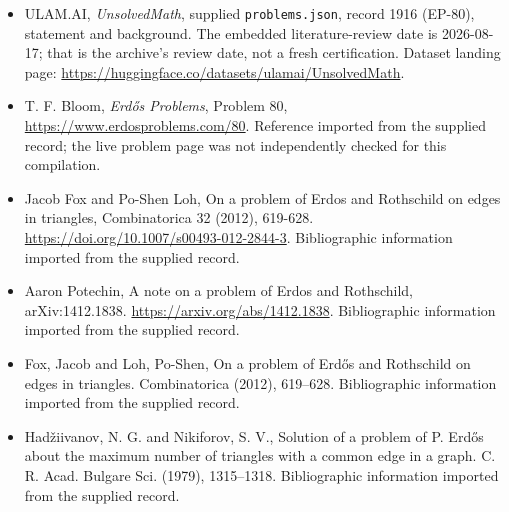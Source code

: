 \documentclass[11pt,a4paper]{article}
\begin{document}
{\small

\begin{itemize}

\item[\hypertarget{source:1916:1}{S1}] ULAM.AI, \emph{UnsolvedMath}, supplied \texttt{problems.json}, record 1916 (EP-80), statement and background. The embedded literature-review date is 2026-08-17; that is the archive’s review date, not a fresh certification. Dataset landing page: \url{https://huggingface.co/datasets/ulamai/UnsolvedMath}.

\item[\hypertarget{source:1916:2}{S2}] T. F. Bloom, \emph{Erdős Problems}, Problem 80, \url{https://www.erdosproblems.com/80}. Reference imported from the supplied record; the live problem page was not independently checked for this compilation.

\item[\hypertarget{source:1916:3}{S3}] Jacob Fox and Po-Shen Loh, On a problem of Erdos and Rothschild on edges in triangles, Combinatorica 32 (2012), 619-628. \url{https://doi.org/10.1007/s00493-012-2844-3}. Bibliographic information imported from the supplied record.

\item[\hypertarget{source:1916:4}{S4}] Aaron Potechin, A note on a problem of Erdos and Rothschild, arXiv:1412.1838. \url{https://arxiv.org/abs/1412.1838}. Bibliographic information imported from the supplied record.

\item[\hypertarget{source:1916:5}{S5}] Fox, Jacob and Loh, Po-Shen, On a problem of Erd\H{o}s and {R}othschild on edges in triangles. Combinatorica (2012), 619--628. Bibliographic information imported from the supplied record.

\item[\hypertarget{source:1916:6}{S6}] Had\v ziivanov, N. G. and Nikiforov, S. V., Solution of a problem of {P}. Erd\H{o}s about the maximum number of triangles with a common edge in a graph. C. R. Acad. Bulgare Sci. (1979), 1315--1318. Bibliographic information imported from the supplied record.

\end{itemize}

}

\label{end:1916}
\end{document}
